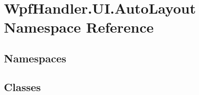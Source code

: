 \hypertarget{namespace_wpf_handler_1_1_u_i_1_1_auto_layout}{}\section{Wpf\+Handler.\+U\+I.\+Auto\+Layout Namespace Reference}
\label{namespace_wpf_handler_1_1_u_i_1_1_auto_layout}
\subsection*{Namespaces}
\begin{DoxyCompactItemize}
\end{DoxyCompactItemize}
\subsection*{Classes}
